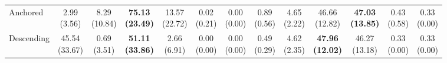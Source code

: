 {\begin{tabular}{l|cccccc|cccccc}
Anchored & \makecell{2.99 \\ (3.56)} & \makecell{8.29 \\ (10.84)} & {\cellcolor[HTML]{C8E6C9}} \bfseries \makecell{75.13 \\ (23.49)} & \makecell{13.57 \\ (22.72)} & \makecell{0.02 \\ (0.21)} & \makecell{0.00 \\ (0.00)} & \makecell{0.89 \\ (0.56)} & \makecell{4.65 \\ (2.22)} & {\cellcolor[HTML]{C8E6C9}} \makecell{46.66 \\ (12.82)} & \bfseries \makecell{47.03 \\ (13.85)} & \makecell{0.43 \\ (0.58)} & \makecell{0.33 \\ (0.00)} \\
Descending & \makecell{45.54 \\ (33.67)} & \makecell{0.69 \\ (3.51)} & {\cellcolor[HTML]{C8E6C9}} \bfseries \makecell{51.11 \\ (33.86)} & \makecell{2.66 \\ (6.91)} & \makecell{0.00 \\ (0.00)} & \makecell{0.00 \\ (0.00)} & \makecell{0.49 \\ (0.29)} & \makecell{4.62 \\ (2.35)} & {\cellcolor[HTML]{C8E6C9}} \bfseries \makecell{47.96 \\ (12.02)} & \makecell{46.27 \\ (13.18)} & \makecell{0.33 \\ (0.00)} & \makecell{0.33 \\ (0.00)} \\
\bottomrule
\end{tabular}
}%
